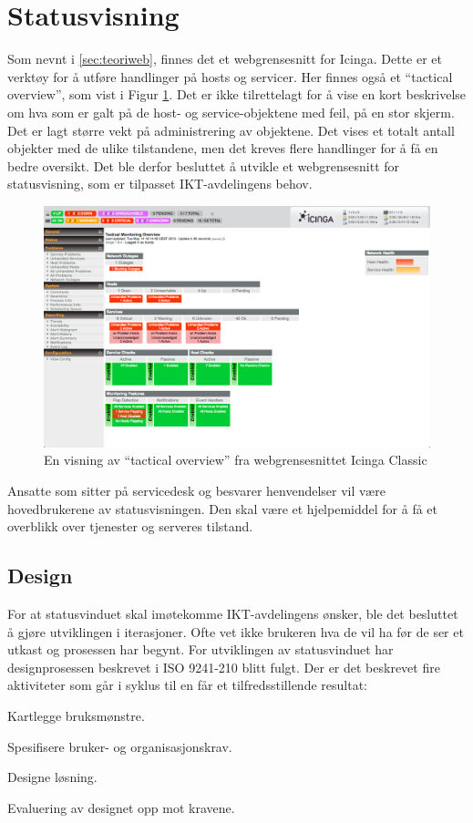 \section{Statusvisning}
Som nevnt i \ref{sec:teoriweb}, finnes det et webgrensesnitt for Icinga. Dette er et verktøy for å utføre handlinger på hosts og servicer. Her finnes også et ``tactical overview'', som vist i Figur \ref{icingawebgui}. Det er ikke tilrettelagt for å vise en kort beskrivelse om hva som er galt på de host- og service-objektene med feil, på en stor skjerm. Det er lagt større vekt på administrering av objektene. Det vises et totalt antall objekter med de ulike tilstandene, men det kreves flere handlinger for å få en bedre oversikt. Det ble derfor besluttet å utvikle et webgrensesnitt for statusvisning, som er tilpasset IKT-avdelingens behov.
\begin{figure}
	\centering
    \includegraphics[width=1.0\textwidth]{img/icinga_tactical}
    \caption{En visning av ``tactical overview'' fra webgrensesnittet Icinga Classic}
    \label{icingawebgui}
\end{figure}

Ansatte som sitter på servicedesk og besvarer henvendelser vil være hovedbrukerene av statusvisningen. Den skal være et hjelpemiddel for å få et overblikk over tjenester og serveres tilstand.

\clearpage
\subsection{Design}
For at statusvinduet skal imøtekomme IKT-avdelingens ønsker, ble det besluttet å gjøre utviklingen i iterasjoner. Ofte vet ikke brukeren hva de vil ha før de ser et utkast og prosessen har begynt. For utviklingen av statusvinduet har designprosessen beskrevet i ISO 9241-210 blitt fulgt. Der er det beskrevet fire aktiviteter som går i syklus til en får et tilfredsstillende resultat:
\begin{itemize*}
	\item Kartlegge bruksmønstre.
	\item Spesifisere bruker- og organisasjonskrav.
	\item Designe løsning.
	\item Evaluering av designet opp mot kravene.
\end{itemize*}


